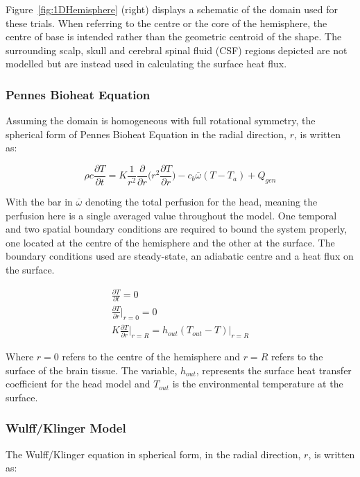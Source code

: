 \documentclass[11pt,english,a4paper,twoside,openright]{report}
\begin{document}
{{{{{{{{Figure~\ref{fig:1DHemisphere} (right) displays a schematic of the domain used for these trials. When referring to the centre or the core of the hemisphere, the centre of base is intended rather than the geometric centroid of the shape. The surrounding scalp, skull and cerebral spinal fluid (CSF) regions depicted are not modelled but are instead used in calculating the surface heat flux.  

\subsubsection{Pennes Bioheat Equation}

Assuming the domain is homogeneous with full rotational symmetry, the spherical form of Pennes Bioheat Equation in the radial direction, $r$, is written as:

\begin{equation}
\rho c\frac{\partial T}{\partial t} = K\frac{1}{r^{2}}\frac{\partial}{\partial r}\bigg(r^{2}\frac{\partial T}{\partial r}\bigg)-c_{b}\overline{\omega}(T-T_{a}) + Q_{gen}
\end{equation}

With the bar in $\overline{\omega}$ denoting the total perfusion for the head, meaning the perfusion here is a single averaged value throughout the model. One temporal and two spatial boundary conditions are required to bound the system properly, one located at the centre of the hemisphere and the other at the surface. The boundary conditions used are steady-state, an adiabatic centre and a heat flux on the surface.

\begin{gather}
\frac{\partial T}{\partial t} = 0 \\
\frac{\partial T}{\partial r}\biggr|_{r=0} 	= 0 \\
K\frac{\partial T}{\partial r}\biggr|_{r=R} = h_{out}(T_{out}-T)\bigr|_{r=R}
\end{gather}

Where $r=0$ refers to the centre of the hemisphere and $r=R$ refers to the surface of the brain tissue. The variable, $h_{out}$, represents the surface heat transfer coefficient for the head model and $T_{out}$ is the environmental temperature at the surface.

\subsubsection{Wulff/Klinger Model}

The Wulff/Klinger equation in spherical form, in the radial direction, $r$, is written as:

}}}}}}}}
\end{document}
